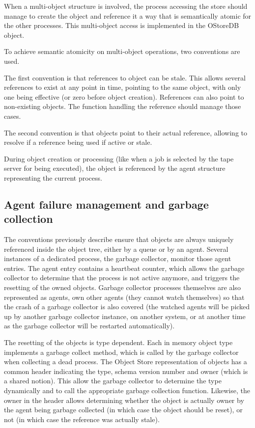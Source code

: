 When a multi-object structure is involved, the process accessing the store should manage to create the object and reference it a way that is semantically atomic for the other processes. This multi-object access is implemented in the OStoreDB object.

To achieve semantic atomicity on multi-object operations, two conventions are used.

The first convention is that references to object can be stale. This allows several references to exist at any point in time, pointing to the same object, with only one being effective (or zero before object creation). References can also point to non-existing objects. The function handling the reference should manage those cases.

The second convention is that objects point to their actual reference, allowing to resolve if a reference being used if active or stale.

During object creation or processing (like when a job is selected by the tape server for being executed), the object is referenced by the agent structure representing the current process.

\subsection{Agent failure management and garbage collection}
\label{subsec:agentFailure}
The conventions previously describe ensure that objects are always uniquely referenced inside the object tree, either by a queue or by an agent. Several instances of a dedicated process, the garbage collector, monitor those agent entries. The agent entry contains a heartbeat counter, which allows the garbage collector to determine that the process is not active anymore, and triggers the resetting of the owned objects. Garbage collector processes themselves are also represented as agents, own other agents (they cannot watch themselves) so that the crash of a garbage collector is also covered (the watched agents will be picked up by another garbage collector instance, on another system, or at another time as the garbage collector will be restarted automatically).

The resetting of the objects is type dependent. Each in memory object type implements a garbage collect method, which is called by the garbage collector when collecting a dead process. The Object Store representation of objects has a common header indicating the type, schema version number and owner (which is a shared notion). This allow the garbage collector to determine the type dynamically and to call the appropriate garbage collection function. Likewise, the owner in the header allows determining whether the object is actually owner by the agent being garbage collected (in which case the object should be reset), or not (in which case the reference was actually stale).

